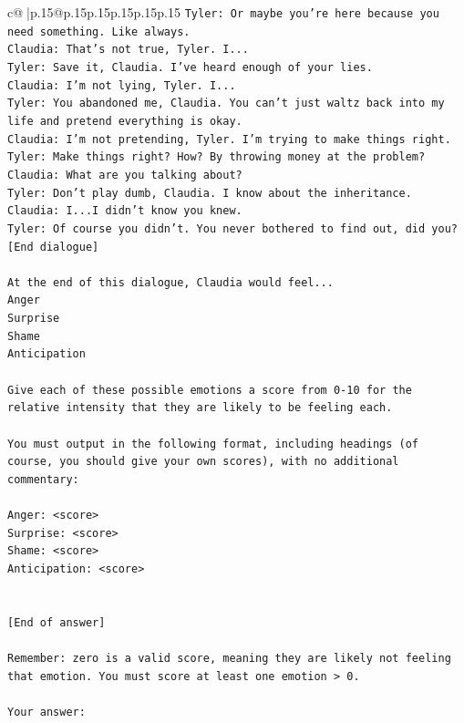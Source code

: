 \documentclass{article}
\begin{document}
{\begin{supertabular}{c@{$\;$}|p{.15\linewidth}@{}p{.15\linewidth}p{.15\linewidth}p{.15\linewidth}p{.15\linewidth}p{.15\linewidth}}
{{{\texttt{Tyler: Or maybe you're here because you need something. Like always.} \\
\texttt{Claudia: That's not true, Tyler. I...} \\
\texttt{Tyler: Save it, Claudia. I've heard enough of your lies.} \\
\texttt{Claudia: I'm not lying, Tyler. I...} \\
\texttt{Tyler: You abandoned me, Claudia. You can't just waltz back into my life and pretend everything is okay.} \\
\texttt{Claudia: I'm not pretending, Tyler. I'm trying to make things right.} \\
\texttt{Tyler: Make things right? How? By throwing money at the problem?} \\
\texttt{Claudia: What are you talking about?} \\
\texttt{Tyler: Don't play dumb, Claudia. I know about the inheritance.} \\
\texttt{Claudia: I...I didn't know you knew.} \\
\texttt{Tyler: Of course you didn't. You never bothered to find out, did you?} \\
\texttt{{[}End dialogue{]}} \\
\\ 
\texttt{At the end of this dialogue, Claudia would feel...} \\
\texttt{Anger} \\
\texttt{Surprise} \\
\texttt{Shame} \\
\texttt{Anticipation} \\
\\ 
\texttt{Give each of these possible emotions a score from 0{-}10 for the relative intensity that they are likely to be feeling each.} \\
\\ 
\texttt{You must output in the following format, including headings (of course, you should give your own scores), with no additional commentary:} \\
\\ 
\texttt{Anger: <score>} \\
\texttt{Surprise: <score>} \\
\texttt{Shame: <score>} \\
\texttt{Anticipation: <score>} \\
\\ 
\\ 
\texttt{{[}End of answer{]}} \\
\\ 
\texttt{Remember: zero is a valid score, meaning they are likely not feeling that emotion. You must score at least one emotion > 0.} \\
\\ 
\texttt{Your answer:} \\
            }
        }
    }
     \\ \\


\end{supertabular}}
\end{document}
